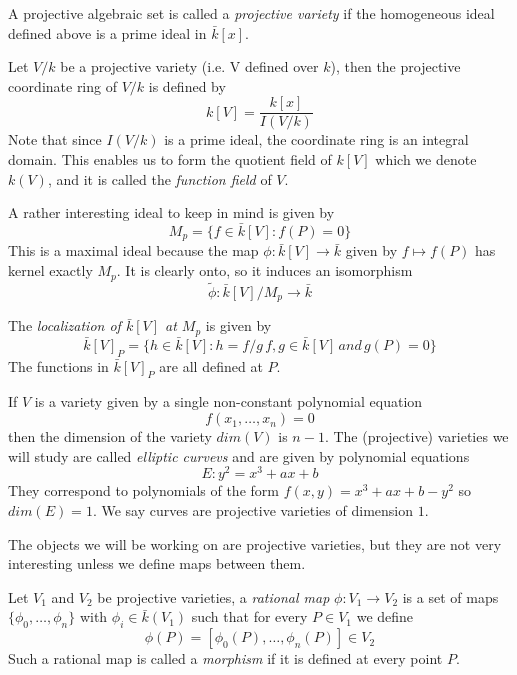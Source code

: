 \begin{mydef}
 A projective algebraic set is called a \emph{projective variety} if the homogeneous
ideal defined above is a prime ideal in $\bar{k}[x]$.
\end{mydef}

\begin{mydef}
 Let $V/k$ be a projective variety (i.e. V defined over $k$), then the projective coordinate
ring of $V/k$ is defined by
$$ k[V] = \frac{k[x]}{I(V/k)}$$
Note that since $I(V/k)$ is a prime ideal, the coordinate ring is an integral domain.
This enables us to form the quotient field of $k[V]$ which we denote $k(V)$, and it is called
the \emph{function field} of $V$.
\end{mydef}

A rather interesting ideal to keep in mind is given by
$$ M_p = \{ f\in \bar{k}[V] : f(P)=0 \} $$
This is a maximal ideal because the map $\phi: \bar{k}[V] \rightarrow \bar{k}$ given by
$ f \mapsto f(P) $ has kernel exactly $M_p$. It is clearly onto, so it induces an
isomorphism $$\tilde{\phi}: \bar{k}[V]/M_p \rightarrow \bar{k} $$

\begin{mydef}
 The \emph{localization of $\bar{k}[V]$ at $M_p$} is given by
$$ \bar{k}[V]_P = \{ h \in \bar{k}[V] : h = f/g\, f,g\in \bar{k}[V]\, and\, g(P)=0 \} $$
The functions in $\bar{k}[V]_P$ are all defined at $P$.
\end{mydef}

\begin{ex}
 If $V$ is a variety given by a single non-constant polynomial equation
$$f(x_1,\ldots,x_n) = 0$$ 
then the dimension of the variety $dim(V)$ is $n-1$. The (projective) varieties
we will study are called \emph{elliptic curvevs} and are
given by polynomial equations
$$E: y^2 = x^3+ax+b$$
They correspond to polynomials of the form $f(x,y) = x^3+ax+b-y^2$ so $dim(E)=1$.
We say curves are projective varieties of dimension $1$.
\end{ex}

The objects we will be working on are projective varieties, but they are not
very interesting unless we define maps between them.

\begin{mydef}
 Let $V_1$ and $V_2$ be projective varieties, a \emph{rational map} $\phi: V_1 \rightarrow V_2$
is a set of maps $\{\phi_0,\ldots,\phi_n\}$ with $\phi_i \in \bar{k}(V_1)$ such that for every
$P\in V_1$ we define
$$\phi(P) = [\phi_0(P),\ldots,\phi_n(P)] \in V_2$$
Such a rational map is called a \emph{morphism} if it is defined at every point $P$.
\end{mydef}

